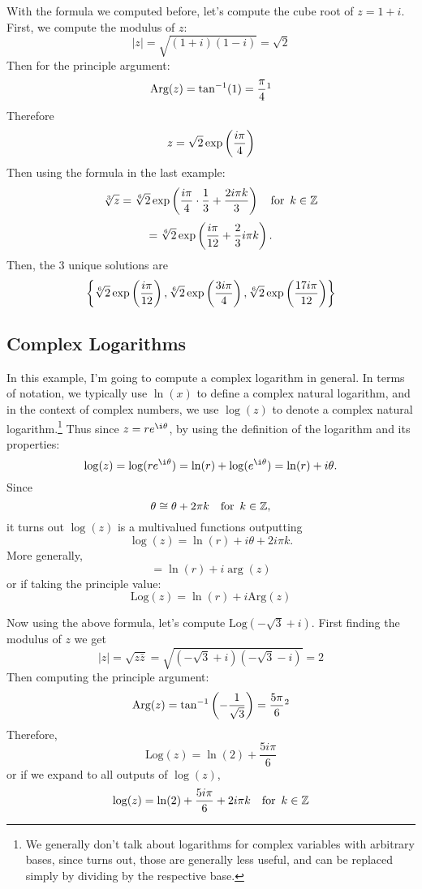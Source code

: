 \begin{ex}
	With the formula we computed before, let's compute the cube root of $z=1+i$.
	First, we compute the modulus of $z$:
	$$|z|=\sqrt{(1+i)(1-i)}=\sqrt{2}$$
	Then for the principle argument:
	$$\text{Arg}(z)=\tan^{-1}(1)=\frac{\pi}{4}\footnotemark$$
	Therefore
	$$z=\sqrt{2}\exp\left(\frac{i\pi}{4}\right)$$
	Then using the formula in the last example:
	$$\sqrt[3]{z}=\sqrt[6]{2}\exp\left(\frac{i\pi}{4}\cdot\frac{1}{3}+\frac{2i\pi k}{3}\right) \quad\text{for }\, k\in\mathbb{Z}$$
	$$=\sqrt[6]{2}\exp\left(\frac{i\pi}{12}+\frac{2}{3}i\pi k\right).$$
	Then, the 3 unique solutions are
	$$\left\{\sqrt[6]{2}\exp\left(\frac{i\pi}{12}\right),\sqrt[6]{2}\exp\left(\frac{3i\pi}{4}\right),\sqrt[6]{2}\exp\left(\frac{17i\pi}{12}\right)\right\}$$
\end{ex}
\subsection{Complex Logarithms}
\begin{ex}
	In this example, I'm going to compute a complex logarithm in general. In terms of notation, we typically use $\ln(x)$ to define a complex natural logarithm, and in the context of complex numbers, we use $\log(z)$ to denote a complex natural logarithm.\footnote{We generally don't talk about logarithms for complex variables with arbitrary bases, since turns out, those are generally less useful, and can be replaced simply by dividing by the respective base.}
	Thus since $z=re^{\i\theta}$, by using the definition of the logarithm and its properties:
	$$\log(z)=\log(re^{\i\theta})=\ln(r)+\log(e^{\i\theta})=\ln(r)+i\theta.$$
	Since 
	$$\theta\cong\theta +2\pi k \quad\text{for }\, k\in\mathbb{Z},$$
	it turns out $\log(z)$ is a multivalued functions outputting
	$$\log(z)=\ln(r)+i\theta+2i\pi k.$$
	More generally,
	$$=\ln(r)+i\arg(z)$$
	or if taking the principle value:
	$$\text{Log}(z)=\ln(r)+i\text{Arg}(z)$$
\end{ex}
\begin{ex}
	Now using the above formula, let's compute $\text{Log}(-\sqrt{3}+i)$.
	First finding the modulus of $z$ we get
	$$|z|=\sqrt{z\bar{z}}=\sqrt{(-\sqrt{3}+i)(-\sqrt{3}-i)}=2$$
	Then computing the principle argument:
	$$\text{Arg}(z)=\tan^{-1}\paren{-\frac{1}{\sqrt{3}}}=\frac{5\pi}{6}\footnotemark$$
	Therefore,
	$$\text{Log}(z)=\ln(2)+\frac{5i\pi}{6}$$
	or if we expand to all outputs of $\log(z)$,
	$$\log(z)=\ln(2)+\frac{5i\pi}{6}+2i\pi k \quad\text{for }\, k\in\mathbb{Z}$$
\end{ex}









